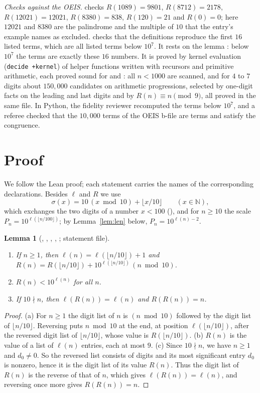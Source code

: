 \documentclass[11pt]{amsart}
\theoremstyle{plain}
\newtheorem{lemma}[theorem]{Lemma}
\theoremstyle{definition}
\newcommand{\N}{\mathbb{N}}
\newcommand{\sw}{\sigma}
\newcommand{\len}{\ell}
\begin{document}
\emph{Checks against the OEIS.}  checks $R(1089)=9801$, $R(8712)=2178$, $R(12021)=12021$, $R(8380)=838$, $R(120)=21$ and $R(0)=0$; here $12021$ and $8380$ are the palindrome and the multiple of $10$ that the entry's example names as excluded.  checks that the definitions reproduce the first $16$ listed terms, which are all listed terms below $10^7$. It rests on the lemma : below $10^7$ the terms are exactly these $16$ numbers. It is proved by kernel evaluation (\texttt{decide +kernel}) of helper functions written with recursors and primitive arithmetic, each proved sound for  and : all $n<1000$ are scanned, and for $4$ to $7$ digits about $150{,}000$ candidates on arithmetic progressions, selected by one-digit facts on the leading and last digits and by $R(n)\equiv n\pmod9$, all proved in the same file. In Python, the fidelity reviewer recomputed the terms below $10^7$, and a referee checked that the $10{,}000$ terms of the OEIS b-file are terms and satisfy the congruence.

\section{Proof}\label{sec:proof}

We follow the Lean proof; each statement carries the names of the corresponding declarations. Besides $\len$ and $R$ we use
\[
  \sw(x)=10\,(x\bmod10)+\lfloor x/10\rfloor\qquad(x\in\N),
\]
which exchanges the two digits of a number $x<100$ (), and for $n\ge10$ the scale $P_n=10^{\len(\lfloor n/100\rfloor)}$; by Lemma~\ref{lem:len} below, $P_n=10^{\len(n)-2}$.

\begin{lemma}[, , , , ; statement file]\label{lem:basic}
\begin{enumerate}
\item[(a)] If $n\ge1$, then $\len(n)=\len(\lfloor n/10\rfloor)+1$ and $R(n)=R(\lfloor n/10\rfloor)+10^{\len(\lfloor n/10\rfloor)}\,(n\bmod10)$.
\item[(b)] $R(n)<10^{\len(n)}$ for all $n$.
\item[(c)] If $10\nmid n$, then $\len(R(n))=\len(n)$ and $R(R(n))=n$.
\end{enumerate}
\end{lemma}

\begin{proof}
(a) For $n\ge1$ the digit list of $n$ is $(n\bmod10)$ followed by the digit list of $\lfloor n/10\rfloor$. Reversing puts $n\bmod10$ at the end, at position $\len(\lfloor n/10\rfloor)$, after the reversed digit list of $\lfloor n/10\rfloor$, whose value is $R(\lfloor n/10\rfloor)$.
(b) $R(n)$ is the value of a list of $\len(n)$ entries, each at most $9$.
(c) Since $10\nmid n$, we have $n\ge1$ and $d_0\ne0$. So the reversed list consists of digits and its most significant entry $d_0$ is nonzero, hence it is the digit list of its value $R(n)$. Thus the digit list of $R(n)$ is the reverse of that of $n$, which gives $\len(R(n))=\len(n)$, and reversing once more gives $R(R(n))=n$.
\end{proof}
\end{document}

